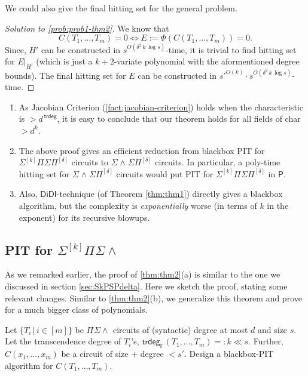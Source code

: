 \documentclass[10pt,a4paper]{article}
\renewcommand{\P}{\mathsf{P}}
\newcommand{\DiDI}{\mathsf{DiDI}}
\newcommand{\F}{\mathbb{F}}
\newcommand{\tdeg}{\mathsf{trdeg}}
\newcommand{\SPSP}[3]{\Sigma^{#1}\Pi^{#2}\Sigma\Pi^{#3}}
\newcommand{\SWSP}[3]{\Sigma^{#1}\!\wedge^{#2}\!\Sigma\Pi^{#3}}
\newcommand{\PSU}[2]{\Pi^{#1} \Sigma\wedge^{#2}}
\newcommand{\SPSU}[3]{\Sigma^{#1} \Pi^{#2} \Sigma \wedge^{#3}}
\numberwithin{equation}{section}
\begin{document}
We could also give the final hitting set for the general problem.

\begin{proof}[Solution to \autoref{prob:prob1-thm2}]
We know that \[C(T_1,\hdots,T_m) = 0 \iff E:= \Phi(C(T_1,\hdots,T_m)) =0.\] 
 Since, $H'$ can be constructed in $s^{O(\delta^2\,k\,\log s)}$-time, it is trivial to find hitting set for $E\rvert_{H'}$ (which is just a $k+2$-variate polynomial with the aformentioned degree bounds). The final hitting set for $E$ can be constructed in $s'^{O(k)} \cdot s^{O(\delta^2\,k\,\log s)}$-time.
\end{proof}

%

\begin{remark*}
\begin{enumerate}
    \setlength\itemsep{1em}
    \item As Jacobian Criterion (\autoref{fact:jacobian-criterion}) holds when the characteristic is $> d^{\,\tdeg}$, it is easy to conclude that our theorem holds for all fields of char $> d^k$.
    \item The above proof gives an efficient reduction from blackbox PIT for $\SPSP{[k]}{}{[\delta]}$ circuits to $\SWSP{}{}{[\delta]}$ circuits. In particular, a poly-time hitting set for $\SWSP{}{}{[\delta]}$ circuits would put PIT for $\SPSP{[k]}{}{[\delta]}$ in $\P$. 
    \item Also, $\DiDI$-technique (of Theorem \autoref{thm:thm1}) directly gives a blackbox algorithm, but the complexity is {\em exponentially} worse (in terms of $k$ in the exponent) for its recursive blowups.
\end{enumerate}
\end{remark*}

\subsection{PIT for \texorpdfstring{$\SPSU{[k]}{}{}$}{SkPSU}}

As we remarked earlier, the proof of \autoref{thm:thm2}(a) is similar to the one we discussed in section \ref{sec:SkPSPdelta}. Here we sketch the proof, stating some relevant changes. Similar to \autoref{thm:thm2}(b), we generalize this theorem and prove for a much bigger class of polynomials.  

\begin{problem}\label{prob:prob2-thm2}
 Let $\{T_i \,|\, i \in [m]\}$ be $\PSU{}{}$ circuits of (syntactic) degree at most $d$ and size $s$. Let the transcendence degree of $T_i$'s, $\tdeg_{\F}(T_1,\hdots,T_m) =:k \ll s$. Further, $C(x_1,\hdots,x_m)$ be a circuit of size + degree $<s'$. Design a blackbox-PIT algorithm for $C(T_1,\hdots,T_m)$.
\end{problem}
\end{document}
